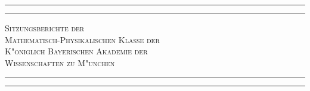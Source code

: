 \documentclass[a4paper, 11pt, oneside]{article}
\begin{document}
\frakfamily
\renewcommand{\contentsname}{
\frakfamily{Inhaltsverzeichnis}
}
\let\origcftsecfont\cft
\let\origcftsecpagefont\cftsecpagefont
\let\origcftsecafterpnum\cftsecafterpnum
\renewcommand{\cftsecpagefont}{\frakfamily{\origcftsecpagefont}}
\renewcommand{\cftsecafterpnum}{\frakfamily{\origcftsecafterpnum}}
\let\origcftsubsecpagefont\cftsubsecpagefont
\let\origcftsubsecafterpnum\cftsubsecafterpnum
\renewcommand{\cftsubsecpagefont}{\frakfamily{\origcftsubsecpagefont}}
\renewcommand{\cftsubsecafterpnum}{\frakfamily{\origcftsubsecafterpnum}}
\let\origcftsubsubsecpagefont\cftsubsubsecpagefont
\let\origcftsubsubsecafterpnum\cftsubsubsecafterpnum
\renewcommand{\cftsubsubsecpagefont}{\frakfamily{\origcftsubsubsecpagefont}}
\renewcommand{\cftsubsubsecafterpnum}{\frakfamily{\origcftsubsubsecafterpnum}}
\begin{titlepage} %
	\centering %

	
	\rule{\textwidth}{1.6pt}\vspace*{-\baselineskip}\vspace*{2pt} %
	\rule{\textwidth}{0.4pt} %
	
	\vspace{1\baselineskip} %
	
	{\scshape\Huge Sitzungsberichte der\\[1.25pt] Mathematisch-Physikalischen Klasse der\\[1.25pt] K"oniglich Bayerischen Akademie der\\[1.25pt] Wissenschaften zu M"unchen\\[1.25pt]}
	
	\vspace{1\baselineskip} %

	\rule{\textwidth}{0.4pt}\vspace*{-\baselineskip}\vspace{3.2pt} %
	\rule{\textwidth}{1.6pt} %
	
	\vspace{1\baselineskip} %
	
	

\end{titlepage}
\end{document}
